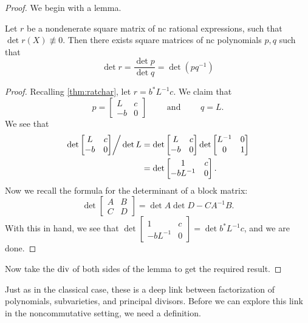 \begin{proof} We begin with a lemma.
  \begin{lemma}
    Let \(r\) be a nondenerate square matrix of nc rational expressions, such that
    \(\det r(X) \not\equiv 0 \). Then there exists square matrices of nc polynomials
    \(p,q\)
    such that
    \[
      \det r = \frac{\det p}{\det q} = \det (pq ^{-1})
    \]
  \end{lemma}

  \begin{proof}
    Recalling \cref{thm:ratchar}, let \(r = b^* L ^{-1} c\). We claim that
    \[
      p = \begin{bmatrix} L&c\\-b&0 \end{bmatrix}  \qquad \textrm{ and } \qquad q = L.
    \]
    We see that
    \begin{align*}
      \left.\det \begin{bmatrix} L&c\\-b&0 \end{bmatrix}  \right / \det L
        &=\det \begin{bmatrix} L&c\\-b&0 \end{bmatrix} \det \begin{bmatrix} L ^{-1}&0\\0&1 \end{bmatrix} \\
        &= \det \begin{bmatrix} 1&c\\-bL ^{-1}&0 \end{bmatrix} .
    \end{align*}
    Now we recall the formula for the determinant of a block matrix:
    \[
      \det \begin{bmatrix} A&B\\C&D \end{bmatrix}  = \det A\det D - CA^{-1}B.
    \]
    With this in hand, we see that
    \(\det \left[ \begin{smallmatrix}1&c\\-bL^{-1}&0\end{smallmatrix} \right] = \det b^*L ^{-1}c\),
    and we are done.
  \end{proof}
  Now take the \(\operatorname{div}\) of both sides of the lemma to get the required result.
\end{proof}

Just as in the classical case, these is a deep link between factorization of
polynomials, subvarieties, and principal divisors. Before we can explore this
link in the noncommutative setting, we need a definition.

